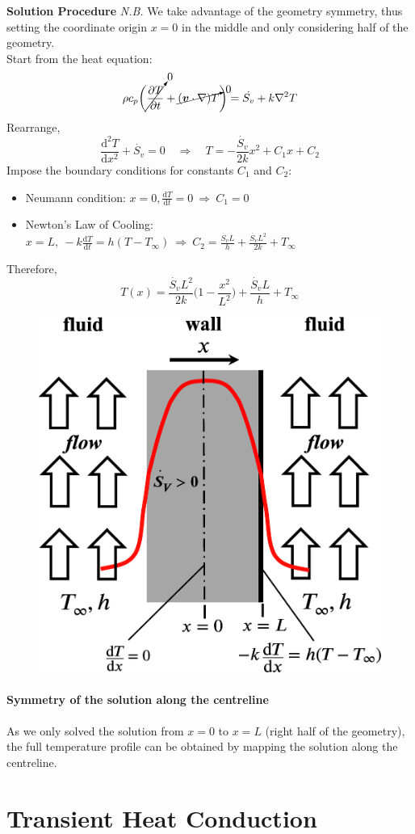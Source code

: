 \documentclass[12pt, a4paper]{article}
\begin{document}
\begin{tcolorbox}[breakable, title = \textbf{Example: Internal Heat Generation}]
\textbf{Solution Procedure} \quad 
\emph{N.B.} We take advantage of the geometry symmetry, thus setting the coordinate origin $x=0$ in the middle and only considering half of the geometry. \\
Start from the heat equation:
\[ 
    \rho c_{p} \bigg( \cancelto{0}{\frac{\partial T}{\partial t}} +\cancelto{0}{(\bm{v} \cdot \nabla) T} \bigg) = \dot{S_{v}}  +k \nabla^{2} T 
\]
Rearrange,
\[ 
    \frac{\mathrm{d}^{2} T}{\mathrm{d}x^{2}} + \dot{S_{v}}=0 \quad \Rightarrow \quad T = -\frac{\dot{S_{v}}}{2k}x^{2}+C_{1}x + C_{2}
\]
Impose the boundary conditions for constants $C_1$ and $C_2$:
\begin{itemize}
    \item Neumann condition: $\displaystyle x=0, \frac{\mathrm{d}T}{\mathrm{d}t}=0 \ \Rightarrow \  C_{1}=0$
    \item Newton's Law of Cooling: $\displaystyle x=L, \ -k\frac{\mathrm{d}T}{\mathrm{d}t}=h(T-T_{\infty}) \ \Rightarrow \ C_{2}=\frac{\dot{S_{v}}L}{h}+\frac{\dot{S_{v}}L^{2}}{2k}+T_{\infty}$ 
\end{itemize}
Therefore,
\[
    T(x) = \frac{\dot{S_{v}}L^{2}}{2k} \bigg( 1-\frac{x^{2}}{L^{2}} \bigg) + \frac{\dot{S_{v}}L}{h} + T_{\infty} 
\]
\begin{figure}[H]
    \centering
    \includegraphics[width=.4\textwidth]{img/internal_heat_gen_solution.eps}
\end{figure}
\paragraph{Symmetry of the solution along the centreline} As we only solved the solution from $x=0$ to $x=L$ (right half of the geometry), the full temperature profile can be obtained by mapping the solution along the centreline.
\end{tcolorbox}

\newpage
\section{Transient Heat Conduction}
\end{document}
